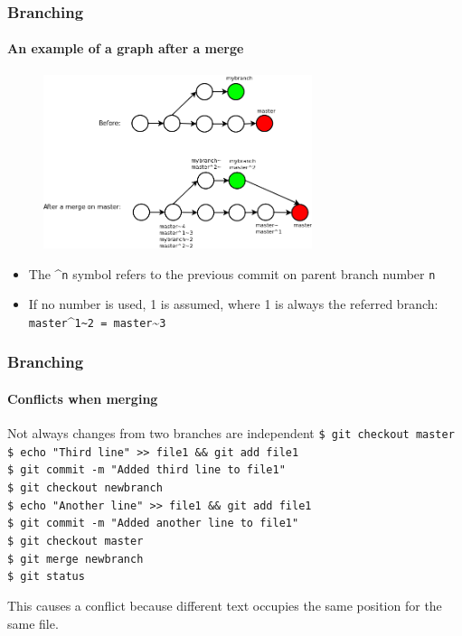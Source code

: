\begin{frame}
\frametitle{Branching}
\framesubtitle{An example of a graph after a merge}

\begin{figure}
\includegraphics[width=0.7\textwidth]{lecture03/img/merging.png}
\end{figure}

\begin{itemize}
\item The \textasciicircum{}\texttt{n} symbol refers to the previous commit on parent branch number \texttt{n}
\item If no number is used, 1 is assumed, where 1 is always the referred branch: \texttt{master}\textasciicircum{}\texttt{1\textasciitilde{}2 = master}\textasciitilde{}\texttt{3}
\end{itemize}

\end{frame}

\begin{frame}
\frametitle{Branching}
\framesubtitle{Conflicts when merging}

\begin{block}{Not always changes from two branches are independent}
\texttt{\$ git checkout master}\\
\texttt{\$ echo "Third line" >\;\!\!> file1 \&\& git add file1} \\
\texttt{\$ git commit -m "Added third line to file1"}\\
\texttt{\$ git checkout newbranch}\\
\texttt{\$ echo "Another line" >\;\!\!> file1 \&\& git add file1} \\
\texttt{\$ git commit -m "Added another line to file1"}\\
\texttt{\$ git checkout master}\\
\texttt{\$ git merge newbranch}\\
\texttt{\$ git status}
\medskip

This causes a conflict because different text occupies the same position for the same file.
\end{block}

\end{frame}

